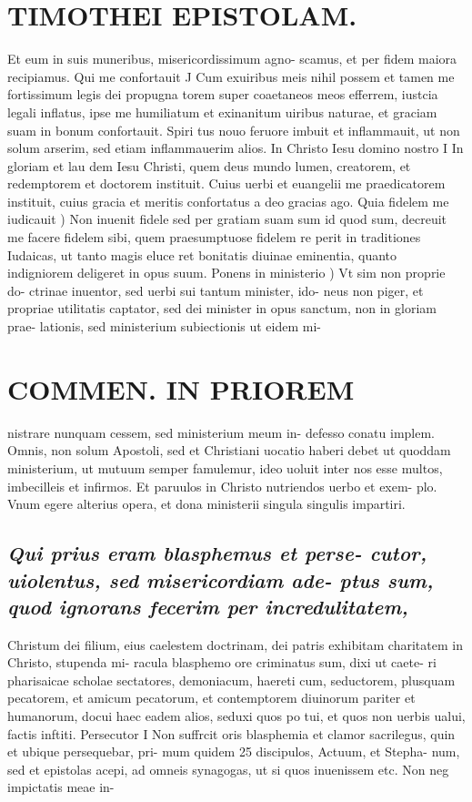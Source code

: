 \documentclass{article}
\begin{document}
\begin{pages}
\section*{TIMOTHEI EPISTOLAM. }
\marginpar{[ p.25 ]}\pstart Et eum in suis muneribus, misericordissimum agno- scamus, et per fidem maiora recipiamus.  \pend\pstart Qui me confortauit J Cum exuiribus meis nihil possem et tamen me fortissimum legis dei propugna torem super coaetaneos meos efferrem, iustcia legali inflatus, ipse me humiliatum et exinanitum uiribus naturae, et graciam suam in bonum confortauit. Spiri tus nouo feruore imbuit et inflammauit, ut non solum arserim, sed etiam inflammauerim alios.  \pend\pstart In Christo Iesu domino nostro I In gloriam et lau dem Iesu Christi, quem deus mundo lumen, creatorem, et redemptorem et doctorem instituit. Cuius uerbi et euangelii me praedicatorem instituit, cuius gracia et meritis confortatus a deo gracias ago.  \pend\pstart Quia fidelem me iudicauit ) Non inuenit fidele sed per gratiam suam sum id quod sum, decreuit me facere fidelem sibi, quem praesumptuose fidelem re perit in traditiones Iudaicas, ut tanto magis eluce ret bonitatis diuinae eminentia, quanto indigniorem deligeret in opus suum.  \pend\pstart Ponens in ministerio ) Vt sim non proprie do- ctrinae inuentor, sed uerbi sui tantum minister, ido- neus non piger, et propriae utilitatis captator, sed dei minister in opus sanctum, non in gloriam prae- lationis, sed ministerium subiectionis ut eidem mi-  \pend
\section*{COMMEN. IN PRIOREM }
\marginpar{[ p.26 ]}\pstart nistrare nunquam cessem, sed ministerium meum in- defesso conatu implem. Omnis, non solum Apostoli, sed et Christiani uocatio haberi debet ut quoddam ministerium, ut mutuum semper famulemur, ideo uoluit inter nos esse multos, imbecilleis et infirmos. Et paruulos in Christo nutriendos uerbo et exem- plo. Vnum egere alterius opera, et dona ministerii singula singulis impartiri.  \pend
{}
{}
\subsection*{\textit{Qui prius eram blasphemus et perse- cutor, uiolentus, sed misericordiam ade- ptus sum, quod ignorans fecerim per incredulitatem, }}\pstart Christum dei filium, eius caelestem doctrinam, dei patris exhibitam charitatem in Christo, stupenda mi- racula blasphemo ore criminatus sum, dixi ut caete- ri pharisaicae scholae sectatores, demoniacum, haereti cum, seductorem, plusquam pecatorem, et amicum pecatorum, et contemptorem diuinorum pariter et humanorum, docui haec eadem alios, seduxi quos po tui, et quos non uerbis ualui, factis inftiti.  \pend\pstart Persecutor I Non suffrcit oris blasphemia et clamor sacrilegus, quin et ubique persequebar, pri- mum quidem 25 discipulos, Actuum, et Stepha- num, sed et epistolas acepi, ad omneis synagogas, ut si quos inuenissem etc. Non neg impictatis meae in-  \pend

\end{pages}
\end{document}
